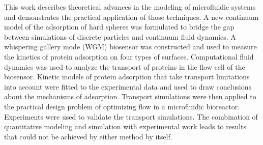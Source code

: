 This work describes theoretical advances in the modeling of microfluidic
systems and demonstrates the practical application of those techniques.
A new continuum model of the adsorption of hard spheres was formulated
to bridge the gap between simulations of discrete particles and continuum
fluid dynamics. A whispering gallery mode (WGM) biosensor was constructed
and used to measure the kinetics of protein adsorption on four types
of surfaces. Computational fluid dynamics was used to analyze the
transport of proteins in the flow cell of the biosensor. Kinetic models
of protein adsorption that take transport limitations into account
were fitted to the experimental data and used to draw conclusions
about the mechanisms of adsorption. Transport simulations were then
applied to the practical design problem of optimizing flow in a microfluidic
bioreactor. Experiments were used to validate the transport simulations.
The combination of quantitative modeling and simulation with experimental
work leads to results that could not be achieved by either method
by itself.
